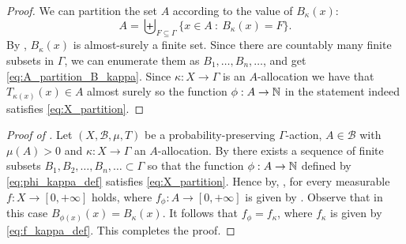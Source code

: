 \documentclass[12pt,reqno]{amsart}
\begin{document}
\begin{proof}
    We can partition the set $A$ according to the value of $B_\kappa(x)$:
    \[A = \biguplus_{F \subseteq \Gamma} \{ x \in A~:~ B_\kappa(x) =F\}.\]
    By , $B_\kappa(x)$ is almost-surely a finite set.
    Since there are countably many finite subsets in $\Gamma$, we can enumerate them as $B_1,\ldots,B_n,\ldots$, and
    get \eqref{eq:A_partition_B_kappa}.
    Since $\kappa:X \to \Gamma$ is an $A$-allocation we have that $T_{\kappa(x)}(x) \in A$ almost surely so the function $\phi:A \to \mathbb{N}$ in the statement indeed satisfies \eqref{eq:X_partition}.
\end{proof}


\begin{proof}[Proof of ]
  Let $(X,\mathcal{B},\mu,T)$ be a probability-preserving $\Gamma$-action, $A \in \mathcal{B}$ with $\mu(A)>0$ and $\kappa:X \to \Gamma$ an $A$-allocation. By  there exists a sequence of finite subsets $B_1,B_2,\ldots,B_n,\ldots \subset \Gamma$ so that the function $\phi:A \to \mathbb{N}$ defined by \eqref{eq:phi_kappa_def} satisfies \eqref{eq:X_partition}.
  Hence by, , for every measurable $f:X\to [0,+\infty]$   holds, where $f_\phi:A \to [0,+\infty]$ is given by .
  Observe that in this case $B_{\phi(x)}(x)=B_\kappa(x)$. It follows that $f_\phi =f_\kappa$, where $f_\kappa$ is given by \eqref{eq:f_kappa_def}.
  This completes the proof.
\end{proof}
\end{document}
